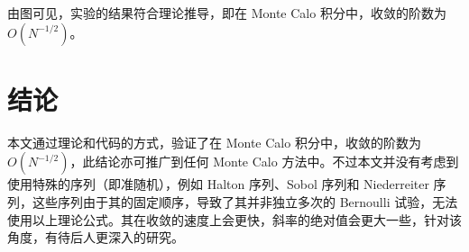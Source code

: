 \documentclass[12pt,a4paper]{article}%
\begin{document}
    \newpage
    由图可见，实验的结果符合理论推导，即在 Monte Calo 积分中，收敛的阶数为 \(O (N^{-1 / 2})\)。


    \section{结论}
    本文通过理论和代码的方式，验证了在 Monte Calo 积分中，收敛的阶数为 \(O (N^{-1 / 2})\)，此结论亦可推广到任何 Monte Calo 方法中。不过本文并没有考虑到使用特殊的序列（即准随机），例如 Halton 序列、Sobol 序列和 Niederreiter 序列，这些序列由于其的固定顺序，导致了其并非独立多次的 Bernoulli 试验，无法使用以上理论公式。其在收敛的速度上会更快，斜率的绝对值会更大一些，针对该角度，有待后人更深入的研究。
\end{document}
